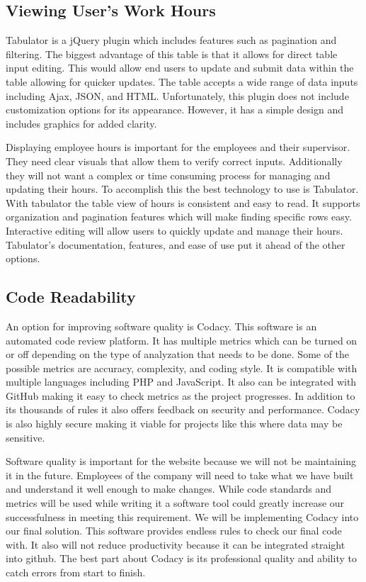 \documentclass[letterpaper,10pt,titlepage,journal,compsoc,draftclsnofoot,onecolumn]{IEEEtran}
\newcommand\tab[1][1cm]{\hspace*{#1}}
\begin{document}
\subsection{Viewing User's Work Hours}

Tabulator is a jQuery plugin which includes features such as pagination and filtering. The biggest advantage of this table is that it allows for direct table input editing. This would allow end users to update and submit data within the table allowing for quicker updates. The table accepts a wide range of data inputs including Ajax, JSON, and HTML. Unfortunately, this plugin does not include customization options for its appearance. However, it has a simple design and includes graphics for added clarity. \newline

\tab Displaying employee hours is important for the employees and their supervisor. They need clear visuals that allow them to verify correct inputs. Additionally they will not want a complex or time consuming process for managing and updating their hours. To accomplish this the best technology to use is Tabulator. With tabulator the table view of hours is consistent and easy to read. It supports organization and pagination features which will make finding specific rows easy. Interactive editing will allow users to quickly update and manage their hours. Tabulator's documentation, features, and ease of use put it ahead of the other options.

\subsection{Code Readability}

\tab An option for improving software quality is Codacy. This software is an automated code review platform. It has multiple metrics which can be turned on or off depending on the type of analyzation that needs to be done. Some of the possible metrics are accuracy, complexity, and coding style. It is compatible with multiple languages including PHP and JavaScript. It also can be integrated with GitHub making it easy to check metrics as the project progresses. In addition to its thousands of rules it also offers feedback on security and performance. Codacy is also highly secure making it viable for projects like this where data may be sensitive. \newline

\tab Software quality is important for the website because we will not be maintaining it in the future. Employees of the company will need to take what we have built and understand it well enough to make changes. While code standards and metrics will be used while writing it a software tool could greatly increase our successfulness in meeting this requirement. We will be implementing Codacy into our final solution. This software provides endless rules to check our final code with. It also will not reduce productivity because it can be integrated straight into github. The best part about Codacy is its professional quality and ability to catch errors from start to finish.
\end{document}
